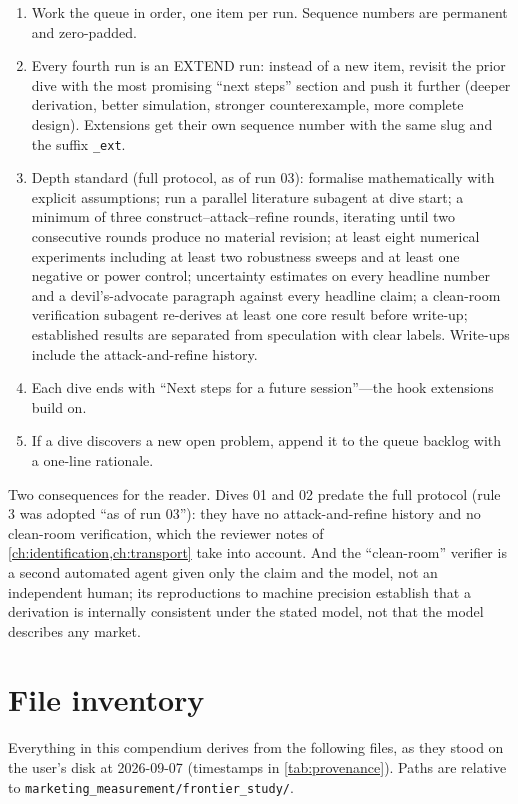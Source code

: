\begin{enumerate}[leftmargin=2em]
\item Work the queue in order, one item per run. Sequence numbers are permanent and zero-padded.
\item Every fourth run is an EXTEND run: instead of a new item, revisit the prior dive with the most promising
``next steps'' section and push it further (deeper derivation, better simulation, stronger counterexample,
more complete design). Extensions get their own sequence number with the same slug and the suffix \texttt{\_ext}.
\item Depth standard (full protocol, as of run 03): formalise mathematically with explicit assumptions; run a
parallel literature subagent at dive start; a minimum of three construct--attack--refine rounds, iterating
until two consecutive rounds produce no material revision; at least eight numerical experiments including at
least two robustness sweeps and at least one negative or power control; uncertainty estimates on every
headline number and a devil's-advocate paragraph against every headline claim; a clean-room verification
subagent re-derives at least one core result before write-up; established results are separated from
speculation with clear labels. Write-ups include the attack-and-refine history.
\item Each dive ends with ``Next steps for a future session''---the hook extensions build on.
\item If a dive discovers a new open problem, append it to the queue backlog with a one-line rationale.
\end{enumerate}

Two consequences for the reader. Dives 01 and 02 predate the full protocol (rule 3 was adopted ``as of run
03''): they have no attack-and-refine history and no clean-room verification, which the reviewer notes of
\cref{ch:identification,ch:transport} take into account. And the ``clean-room'' verifier is a second
automated agent given only the claim and the model, not an independent human; its reproductions to machine
precision establish that a derivation is internally consistent under the stated model, not that the model
describes any market.

\chapter{File inventory}
\label{app:files}

Everything in this compendium derives from the following files, as they stood on the user's disk at
2026-09-07 (timestamps in \cref{tab:provenance}). Paths are relative to
\texttt{marketing\_measurement/frontier\_study/}.

